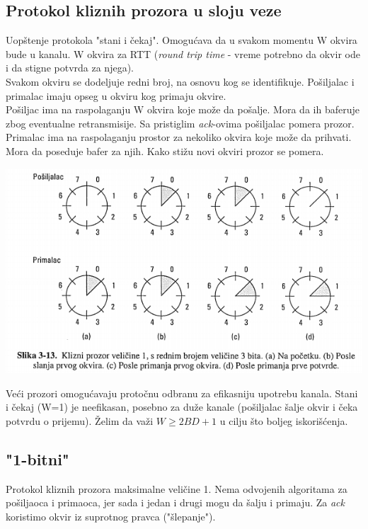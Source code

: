 \documentclass{article} %
\begin{document}
\subsection{Protokol kliznih prozora u sloju veze}

Uop\v{s}tenje protokola "stani i \v{c}ekaj". Omogu\'{c}ava da u svakom momentu W okvira bude u kanalu. W okvira za RTT (\textit{round trip time} - vreme potrebno da okvir ode i da stigne potvrda za njega).\\
Svakom okviru se dodeljuje redni broj, na osnovu kog se identifikuje. Po\v{s}iljalac i primalac imaju opseg u okviru kog primaju okvire.\\
Po\v{s}iljac ima na raspolaganju W okvira koje mo\v{z}e da po\v{s}alje. Mora da ih baferuje zbog eventualne retransmisije. Sa pristiglim \textit{ack}-ovima po\v{s}iljalac pomera prozor.\\
Primalac ima na raspolaganju prostor za nekoliko okvira koje mo\v{z}e da prihvati. Mora da poseduje bafer za njih. Kako sti\v{z}u novi okviri prozor se pomera.\\
\begin{center}
	\includegraphics[scale=0.5]{klizni_prozor}
\end{center}
Ve\'{c}i prozori omogu\'{c}avaju proto\v{c}nu odbranu za efikasniju upotrebu kanala. Stani i \v{c}ekaj (W=1) je neefikasan, posebno za du\v{z}e kanale (po\v{s}iljalac \v{s}alje okvir i \v{c}eka potvrdu o prijemu). \v{Z}elim da va\v{z}i $ W \geq{} 2BD + 1 $ u cilju \v{s}to boljeg iskori\v{s}\'{c}enja.

\subsection{"1-bitni"}

Protokol kliznih prozora maksimalne veli\v{c}ine 1. Nema odvojenih algoritama za po\v{s}iljaoca i primaoca, jer sada i jedan i drugi mogu da \v{s}alju i primaju. Za \textit{ack} koristimo okvir iz suprotnog pravca ("\v{s}lepanje").
\end{document}
